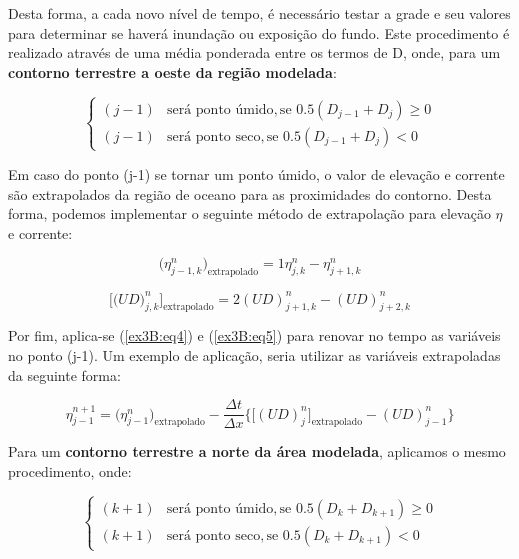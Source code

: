 \documentclass[11pt]{article}
\begin{document}
Desta forma, a cada novo nível de tempo, é necessário testar a grade e
seu valores para determinar se haverá inundação ou exposição do fundo.
Este procedimento é realizado através de uma média ponderada entre os
termos de D, onde, para um \textbf{contorno terrestre a oeste da região
modelada}:

\begin{equation}
\begin{cases}
        (j-1) &\mbox{será ponto úmido},  \mbox{se } 0.5(D_{j-1} + D_j) \ge 0
        \\
        (j-1) & \mbox{será ponto seco}, \mbox{se } 0.5(D_{j-1} + D_j) < 0
\end{cases}
\end{equation}
\bigskip

Em caso do ponto (j-1) se tornar um ponto úmido, o valor de elevação e
corrente são extrapolados da região de oceano para as proximidades do
contorno. Desta forma, podemos implementar o seguinte método de
extrapolação para elevação \(\eta\) e corrente:

\begin{equation}
    \bigg( \eta^{n}_{j-1,k} \bigg)_{\text{extrapolado}} = 1\eta^{n}_{j,k} - \eta^{n}_{j+1,k}
    \label{ex3B:eq4}
\end{equation}

\begin{equation}
    \bigg[ \bigg( UD \bigg)^{n}_{j,k} \bigg]_{\text{extrapolado}} = 2(UD)^{n}_{j+1,k} - (UD)^{n}_{j+2,k}
    \label{ex3B:eq5}
\end{equation}
\bigskip

Por fim, aplica-se (\ref{ex3B:eq4}) e (\ref{ex3B:eq5}) para renovar no
tempo as variáveis no ponto (j-1). Um exemplo de aplicação, seria
utilizar as variáveis extrapoladas da seguinte forma:

\begin{equation}
    \eta^{n+1}_{j-1} = \bigg( \eta^{n}_{j-1} \bigg)_{\text{extrapolado}} - \frac{\Delta{t}}{\Delta{x}}\bigg\{ \bigg[ (UD)^{n}_{j} \bigg]_{\text{extrapolado}} -(UD)^{n}_{j-1} \bigg\}
    \label{ex3B:eq6}
\end{equation}
\bigskip

Para um \textbf{contorno terrestre a norte da área modelada}, aplicamos
o mesmo procedimento, onde:

\begin{equation}
\begin{cases}
        (k+1) &\mbox{será ponto úmido},  \mbox{se } 0.5(D_k + D_{k+1}) \ge 0
        \\
        (k+1) & \mbox{será ponto seco}, \mbox{se } 0.5(D_k + D_{k+1}) < 0
\end{cases}
\end{equation}
\end{document}
